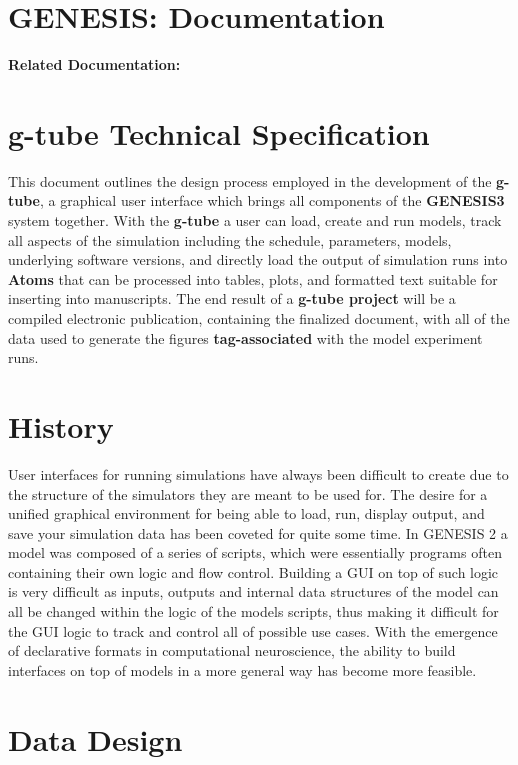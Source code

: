 \documentclass[12pt]{article}
\begin{document}
\section*{GENESIS: Documentation}

{\bf Related Documentation:}

\section*{g-tube Technical Specification}

	This document outlines the design process employed in the development of the {\bf g-tube}, a graphical user interface which brings all components of the {\bf GENESIS3} system together. With the {\bf g-tube} a user can load, create and run models, track all aspects of the simulation including the schedule, parameters, models, underlying software versions, and directly load the output of simulation runs into {\bf Atoms} that can be processed into tables, plots, and formatted text suitable for inserting into manuscripts. The end result of a {\bf g-tube project} will be a compiled electronic publication, containing the finalized document, with all of the data used to generate the figures {\bf tag-associated}  with the model experiment runs. 

\section*{History}

	User interfaces for running simulations have always been difficult to create due to the structure of the simulators they are meant to be used for. The desire for a unified graphical environment for being able to load, run, display output, and save your simulation data has been coveted for quite some time. In GENESIS 2 a model was composed of a series of scripts, which were essentially programs often containing their own logic and flow control. Building a GUI on top of such logic is very difficult as inputs, outputs and internal data structures of the model can all be changed within the logic of the models scripts, thus making it difficult for the GUI logic to track and control all of possible use cases. With the emergence of declarative formats in computational neuroscience, the ability to build interfaces on top of models in a more general way has become more feasible.

\section*{Data Design}
\end{document}
